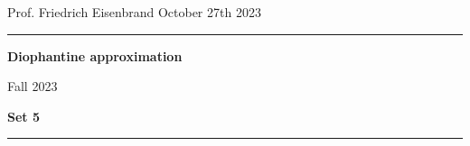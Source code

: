 \documentclass[12pt,a4paper]{article}
\date{}
\theoremstyle{plain}
\newtheorem*{Sol*}{Solution}
\theoremstyle{definition}
\newtheorem{Ex}{Exercise}
\newif\ifsolutions
\newcommand{\exercise}[2]{
			\begin{Ex} #1 \end{Ex}
			\ifsolutions  \begin{Sol*} #2 \end{Sol*} \bigskip \else \bigskip  \fi
		}
\begin{document}
\begin{center}
{Prof. Friedrich Eisenbrand \hfill October 27th 2023}
\end{center}
	
\hrule\vspace{\baselineskip}

\begin{center}
\textbf{Diophantine approximation}

Fall 2023

\bigskip

\textbf{Set 5}
\ifsolutions{\textbf{- Solutions}} \else{} \fi
\end{center}

\hrule\vspace{\baselineskip}



\end{document}

